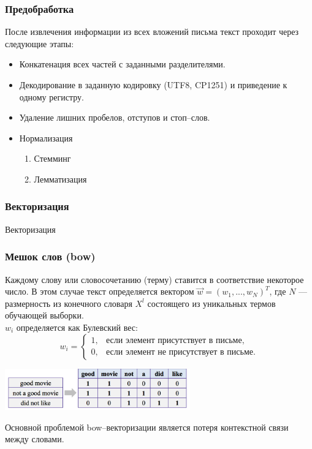 \documentclass[compress,professionalfont]{beamer}
\begin{document}
\begin{frame}
\frametitle{Предобработка}

После извлечения информации из всех вложений письма текст проходит через следующие этапы:
\begin{itemize}
\item Конкатенация всех частей с заданными разделителями.
\item Декодирование в заданную кодировку (UTF8, CP1251) и приведение к одному регистру.
\item Удаление лишних пробелов, отступов и стоп--слов.
\item Нормализация
\begin{enumerate}
\item Стемминг
\item Лемматизация
\end{enumerate}
\end{itemize}

\end{frame}

\begin{frame}
\frametitle{Векторизация}

\begin{center}
Векторизация
\end{center}

\end{frame}

\begin{frame}
\frametitle{Мешок слов (bow)}

Каждому слову или словосочетанию (терму) ставится в соответствие некоторое число. В этом случае текст определяется вектором $\vec{w} = (w_1, ..., w_N)^T$,
где $N$ --- размерность из конечного словаря $X^l$ состоящего из уникальных термов обучающей выборки. \\
$w_i$ определяется как Булевский вес:
$$
w_i = \begin{cases}
1, & \mbox{если элемент присутствует в письме}, \\
0, & \mbox{если элемент не присутствует в письме}.
\end{cases}
$$

\begin{center}
\includegraphics[width=0.6\textwidth]{bow.png}
\end{center}

Основной проблемой bow--векторизации является потеря контекстной связи между словами.

\end{frame}
\end{document}
